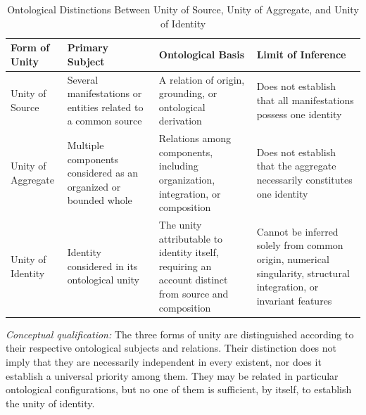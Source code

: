 %
%

\begin{table}[htbp]
\centering
\caption{Ontological Distinctions Between Unity of Source,
Unity of Aggregate, and Unity of Identity}
\label{tab:unity-source-aggregate-identity}

\renewcommand{\arraystretch}{1.45}
\setlength{\tabcolsep}{5pt}

\begin{tabular}{
    p{2.7cm}
    p{3.1cm}
    p{3.4cm}
    p{3.5cm}
}
\hline

\textbf{Form of Unity}
&
\textbf{Primary Subject}
&
\textbf{Ontological Basis}
&
\textbf{Limit of Inference}
\\

\hline

Unity of Source
&
Several manifestations or entities related to a common source
&
A relation of origin, grounding, or ontological derivation
&
Does not establish that all manifestations possess one identity
\\

\hline

Unity of Aggregate
&
Multiple components considered as an organized or bounded whole
&
Relations among components, including organization, integration, or composition
&
Does not establish that the aggregate necessarily constitutes one identity
\\

\hline

Unity of Identity
&
Identity considered in its ontological unity
&
The unity attributable to identity itself, requiring an account distinct from source and composition
&
Cannot be inferred solely from common origin, numerical singularity, structural integration, or invariant features
\\

\hline
\end{tabular}

\vspace{0.5em}

\begin{minipage}{0.94\textwidth}
\small
\textit{Conceptual qualification:}
The three forms of unity are distinguished according to
their respective ontological subjects and relations.
Their distinction does not imply that they are necessarily
independent in every existent, nor does it establish
a universal priority among them.
They may be related in particular ontological configurations,
but no one of them is sufficient, by itself, to establish
the unity of identity.
\end{minipage}

\end{table}

